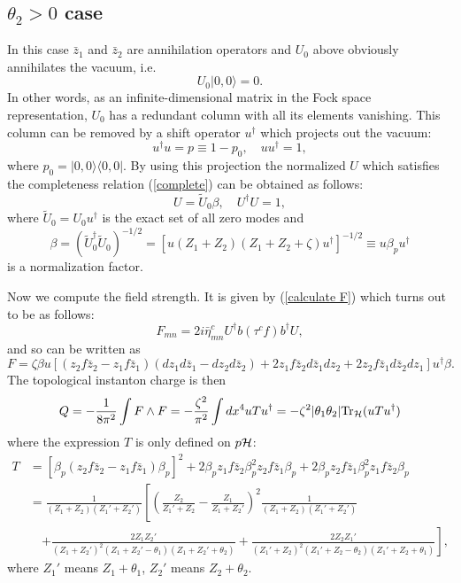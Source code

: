 \documentclass[a4paper,a4paper]{article}
\begin{document}
\subsection{$\theta_2>0$ case}
In this case $\bar z_1$ and $\bar z_2$ are annihilation operators
and  $U_0$ above obviously annihilates the vacuum, i.e.
\begin{equation}
U_0|0,0\rangle=0.
\end{equation}
In other words, as an infinite-dimensional matrix in the Fock space
representation, $U_0$ has a redundant column with all its elements
vanishing. This column can be removed by a shift operator $u^\dag$
which projects out the vacuum:
\begin{equation}
u^\dag u=p\equiv 1-p_0,\quad uu^\dag=1,
\end{equation}
where $p_0=|0,0\rangle\langle 0,0|$. By using this projection the
normalized $U$ which satisfies the completeness relation
(\ref{complete}) can be obtained as follows:
\begin{equation}
U=\tilde U_0\beta,\quad U^\dag U=1,
\end{equation}
where $\tilde U_0=U_0u^\dag$ is the exact set of all zero modes
and
\begin{equation}
\beta=(\tilde U_0^\dag \tilde U_0)^{-1/2}=[u(Z_1+Z_2)(Z_1+Z_2
+\zeta)u^\dag]^{-1/2}\equiv u\beta_p u^\dag
\end{equation}
is a normalization factor.

Now we compute the field strength. It is given  by
(\ref{calculate F}) which turns out to be as follows:
\begin{equation}
\label{F}
F_{mn}=2i\bar\eta^c_{mn}U^\dag b(\tau^c f)b^\dag U,
\end{equation}
and so can be written as
\begin{equation}
F=\zeta\beta u[(z_2 f\bar z_2-z_1 f\bar z_1)(dz_1 d\bar
z_1-dz_2 d\bar z_2)+2z_1 f\bar z_2 d\bar z_1 dz_2+2z_2 f\bar
z_1 d\bar z_2 dz_1]u^\dag\beta.
\end{equation}
The topological instanton charge is then
\begin{equation}
Q=-\frac{1}{8\pi^2}\int F\wedge F=-\frac{\zeta^2}{\pi^2}\int
dx^4 uTu^\dag=-\zeta^2|\theta_1\theta_2|{\rm Tr}_{\cal H}(uTu^\dag)
\end{equation}
where the expression $T$ is only defined on $p{\cal H}$:
\begin{equation}
\begin{array}{rl}
T&=[\beta_p(z_2 f\bar z_2-z_1 f\bar z_1)\beta_p]^2+2\beta_p z_1
f\bar z_2\beta_p^2 z_2 f\bar z_1\beta_p+2\beta_p z_2 f\bar z_1
\beta_p^2 z_1 f\bar z_2\beta_p\\
&=\frac{1}{(Z_1+Z_2)(Z_1'+Z_2')}\left[(\frac{Z_2}{Z_1'+Z_2}-
\frac{Z_1}{Z_1+Z_2'})^2\frac{1}{(Z_1+Z_2)(Z_1'+Z_2')}\right.
\\
&\quad\left.+\frac{2Z_1 Z_2'}{(Z_1+Z_2')^2(Z_1+Z_2'-\theta_1)
(Z_1+Z_2'+\theta_2)}+\frac{2Z_2 Z_1'}{(Z_1'+Z_2)^2(Z_1'+Z_2-
\theta_2)(Z_1'+Z_2+\theta_1)}\right],
\end{array}
\end{equation}
where $Z_1'$ means $Z_1+\theta_1$, $Z_2'$ means $Z_2+\theta_2$.
\end{document}
